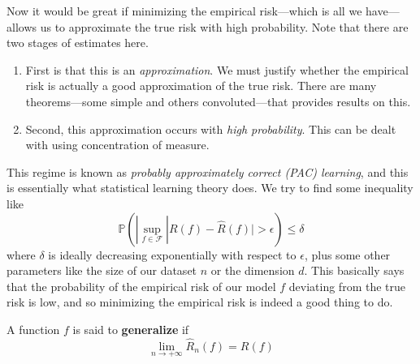 Now it would be great if minimizing the empirical risk---which is all we have---allows us to approximate the true risk with high probability. Note that there are two stages of estimates here. 
\begin{enumerate}
  \item First is that this is an \textit{approximation}. We must justify whether the empirical risk is actually a good approximation of the true risk. There are many theorems---some simple and others convoluted---that provides results on this. 
  \item Second, this approximation occurs with \textit{high probability}. This can be dealt with using concentration of measure. 
\end{enumerate}
This regime is known as \textit{probably approximately correct (PAC) learning}, and this is essentially what statistical learning theory does. We try to find some inequality like 
\begin{equation}
  \mathbb{P}( | \sup_{f \in \mathcal{F}} |R(f) - \hat{R}(f)| > \epsilon ) \leq \delta
\end{equation}
where $\delta$ is ideally decreasing exponentially with respect to $\epsilon$, plus some other parameters like the size of our dataset $n$ or the dimension $d$. This basically says that the probability of the empirical risk of our model $f$ deviating from the true risk is low, and so minimizing the empirical risk is indeed a good thing to do. 

\begin{definition}[Generalize]
  A function $f$ is said to \textbf{generalize} if 
  \begin{equation}
    \lim_{n \rightarrow +\infty} \hat{R}_n (f) = R(f)
  \end{equation}
\end{definition}

